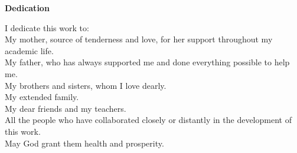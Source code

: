\vspace*{1cm}
\begin{center}
    \textbf{\huge{Dedication}}
\end{center}
\vspace{1cm}

\begin{doublespace} 
    \large{
    \noindent
    I dedicate this work to:\\
    My mother, source of tenderness and love, for her support throughout my academic life.\\
    My father, who has always supported me and done everything possible to help me.\\
    My brothers and sisters, whom I love dearly.\\
    My extended family.\\
    My dear friends and my teachers.\\
    All the people who have collaborated closely or distantly in the development of this work.\\
    May God grant them health and prosperity.
    }
\end{doublespace}
